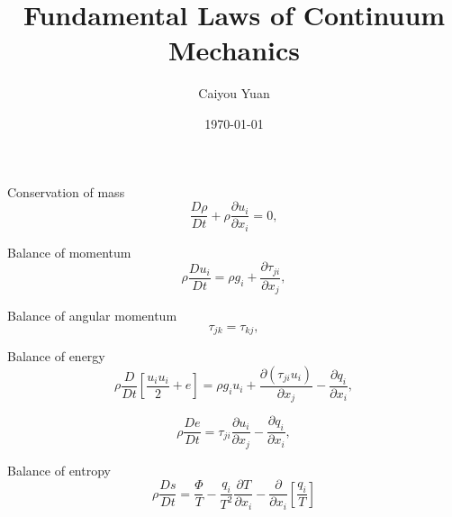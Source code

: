 \documentclass{article}
\title{{\huge \bfseries
       Fundamental Laws of Continuum Mechanics
       }}
\author{Caiyou Yuan}
\date{\today}
\begin{document}
\maketitle

Conservation of mass
$$
\frac{D \rho}{D t} + \rho \frac{\partial u_i}{\partial x_i} = 0,
$$

Balance of momentum
$$
\rho \frac{D u_i}{D t} = \rho g_i + \frac{\partial \tau_{ji}}{\partial x_j},
$$

Balance of angular momentum
$$
\tau_{jk} = \tau_{kj},
$$

Balance of energy
$$
\rho \frac{D}{D t}\left[\frac{u_i u_i}{2} + e \right]
= \rho g_i u_i + \frac{\partial (\tau_{ji} u_i)}{\partial x_j}
- \frac{\partial q_i}{\partial x_i},
$$

$$
\rho \frac{D e}{D t} = \tau_{ji} \frac{\partial u_i}{\partial x_j}
- \frac{\partial q_i}{\partial x_i},
$$

Balance of entropy
$$
\rho \frac{D s}{D t} = \frac{\Phi}{T} - \frac{q_i}{T^2}\frac{\partial T}{\partial x_i}
- \frac{\partial}{\partial x_i}\left[\frac{q_i}{T}\right]
$$

\printbibliography
\end{document}
